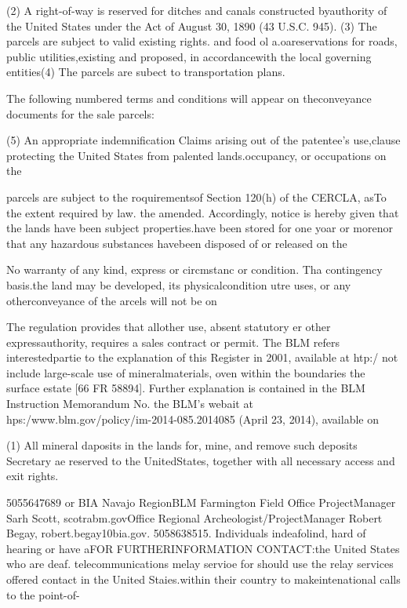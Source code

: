 \documentclass{article}
\begin{document}
\sloppy

(2) A right-of-way is reserved for
ditches and canals constructed byauthority of the United States under the
Act of August 30, 1890 (43 U.S.C. 945).
(3) The parcels are subject to valid
existing rights.
and food ol a.oareservations for roads, public utilities,existing and proposed, in accordancewith the local governing entities(4) The parcels are subect to
transportation plans.


The following numbered terms and
conditions will appear on theconveyance documents for the sale
parcels:


(5) An appropriate indemnification
Claims arising out of the patentee's use,clause protecting the United States from
palented lands.occupancy, or occupations on the


parcels are subject to the roquirementsof Section 120(h) of the CERCLA, asTo the extent required by law. the
amended. Accordingly, notice is hereby
given that the lands have been
subject properties.have been stored for one yoar or morenor that any hazardous substances havebeen disposed of or released on the


No warranty of any kind, express or
circmstanc or condition. Tha contingency basis.the land may be developed, its physicalcondition utre uses, or any otherconveyance of the arcels will not be on


The regulation provides that allother
use, absent statutory er other expressauthority, requires a sales contract or
permit. The BLM refers interestedpartie to the explanation of this
Register in 2001, available at htp:/
not include large-scale use of mineralmaterials, oven within the boundaries the surface estate [66 FR 58894].
Further explanation is contained in the
BLM Instruction Memorandum No.
the BLM's webait at hps:/www.blm.gov/policy/im-2014-085.2014085 (April 23, 2014), available on


(1) All mineral daposits in the lands
for, mine, and remove such deposits
Secretary ae reserved to the UnitedStates, together with all necessary
access and exit rights.


5055647689 or BIA Navajo RegionBLM Farmington Field Office ProjectManager Sarh Scott, scotrabm.govOffice Regional Archeologist/ProjectManager Robert Begay, robert.begay10bia.gov. 5058638515. Individuals indeafolind, hard of hearing or have aFOR FURTHERINFORMATION CONTACT:the United States who are deaf.
telecommunications melay servioe for
should use the relay services offered
contact in the United Staies.within their country to makeintenational calls to the point-of-
\end{document}
